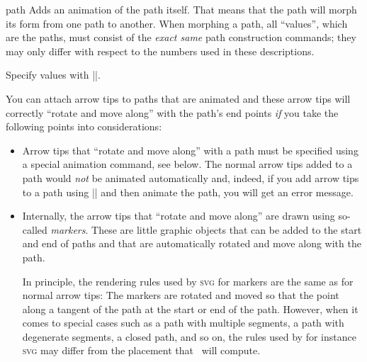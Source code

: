 \begin{sysanimateattribute}{path}
    Adds an animation of the path itself. That means that the path will morph
    its form from one path to another. When morphing a path, all ``values'',
    which are the paths, must consist of the \emph{exact same} path
    construction commands; they may only differ with respect to the numbers
    used in these descriptions.

    Specify values with |\pgfsysanimvalpath|.
\begin{codeexample}[
    preamble={\usetikzlibrary{animations}},
    animation list={0.5,1,1.5,2},
    animation bb={(0.9,-0.1)rectangle(2.1,1.1)},
]
\end{codeexample}

    You can attach arrow tips to paths that are animated and these arrow tips
    will correctly ``rotate and move along'' with the path's end points
    \emph{if} you take the following points into considerations:
    \begin{itemize}
        \item Arrow tips that ``rotate and move along'' with a path must be
            specified using a special animation command, see below. The normal
            arrow tips added to a path would \emph{not} be animated
            automatically and, indeed, if you add arrow tips to a path using
            |\pgfsetarrows| and then animate the path, you will get an error
            message.
        \item Internally, the arrow tips that ``rotate and move along'' are
            drawn using so-called \emph{markers}. These are little graphic
            objects that can be added to the start and end of paths and that
            are automatically rotated and move along with the path.

            In principle, the rendering rules used by \textsc{svg} for markers
            are the same as for normal arrow tips: The markers are rotated and
            moved so that the point along a tangent of the path at the start or
            end of the path. However, when it comes to special cases such as a
            path with multiple segments, a path with degenerate segments, a
            closed path, and so on, the rules used by for instance \textsc{svg}
            may differ from the placement that \pgfname\ will compute.


\end{itemize}
\end{sysanimateattribute}
